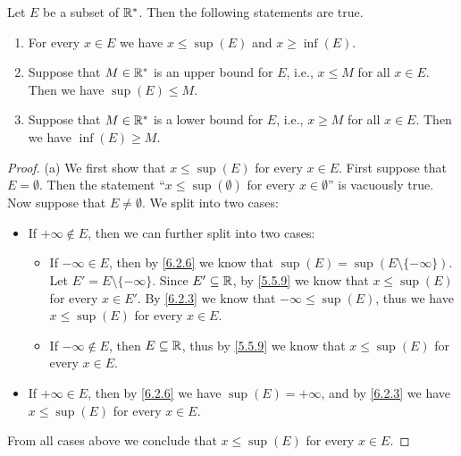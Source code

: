 \begin{thm}\label{6.2.11}
  Let \(E\) be a subset of \(\mathbb{R}^*\).
  Then the following statements are true.
  \begin{enumerate}
    \item For every \(x \in E\) we have \(x \leq \sup(E)\) and \(x \geq \inf(E)\).
    \item Suppose that \(M \in \mathbb{R}^*\) is an upper bound for \(E\), i.e., \(x \leq M\) for all \(x \in E\).
          Then we have \(\sup(E) \leq M\).
    \item Suppose that \(M \in \mathbb{R}^*\) is a lower bound for \(E\), i.e., \(x \geq M\) for all \(x \in E\).
          Then we have \(\inf(E) \geq M\).
  \end{enumerate}
\end{thm}

\begin{proof}{(a)}
  We first show that \(x \leq \sup(E)\) for every \(x \in E\).
  First suppose that \(E = \emptyset\).
  Then the statement ``\(x \leq \sup(\emptyset)\) for every \(x \in \emptyset\)'' is vacuously true.
  Now suppose that \(E \neq \emptyset\).
  We split into two cases:
  \begin{itemize}
    \item If \(+\infty \not\in E\), then we can further split into two cases:
          \begin{itemize}
            \item If \(-\infty \in E\), then by \cref{6.2.6} we know that \(\sup(E) = \sup(E \setminus \{-\infty\})\).
                  Let \(E' = E \setminus \{-\infty\}\).
                  Since \(E' \subseteq \mathbb{R}\), by \cref{5.5.9} we know that \(x \leq \sup(E)\) for every \(x \in E'\).
                  By \cref{6.2.3} we know that \(-\infty \leq \sup(E)\), thus we have \(x \leq \sup(E)\) for every \(x \in E\).
            \item If \(-\infty \notin E\), then \(E \subseteq \mathbb{R}\), thus by \cref{5.5.9} we know that \(x \leq \sup(E)\) for every \(x \in E\).
          \end{itemize}
    \item If \(+\infty \in E\), then by \cref{6.2.6} we have \(\sup(E) = +\infty\), and by \cref{6.2.3} we have \(x \leq \sup(E)\) for every \(x \in E\).
  \end{itemize}
  From all cases above we conclude that \(x \leq \sup(E)\) for every \(x \in E\).


\end{proof}

